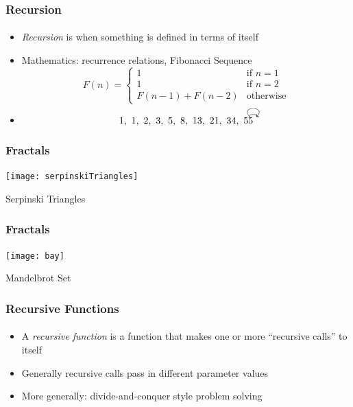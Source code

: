 \documentclass[]{beamer}
\newcommand{\tikzmark}[1]{\tikz[overlay,remember picture] \node (#1) {};}
\newcommand{\DrawBox}[2]{%
  \begin{tikzpicture}[overlay,remember picture]
    \draw[->,shorten >=5pt,shorten <=5pt,out=135,in=45,distance=0.75cm,#1] (MarkC.north) to (MarkA.north);
    \draw[->,shorten >=5pt,shorten <=5pt,out=135,in=45,distance=0.33cm,#2] (MarkC.north) to (MarkB.north);
  \end{tikzpicture}
}
\begin{document}
\begin{frame}[fragile]
  \frametitle{Recursion}
  \framesubtitle{}

\begin{itemize}[<+->]
  \item \emph{Recursion} is when something is defined in terms of itself
  \item Mathematics: recurrence relations, Fibonacci Sequence
    $$F(n) = \left\{\begin{array}{ll}
    1 & \textrm{if } n = 1 \\
    1 & \textrm{if } n = 2 \\
    F(n-1) + F(n-2) & \textrm{otherwise}
    \end{array}\right.$$
  \item[~]
\begin{equation}
1, \,\, 1,\,\, 2,\,\, 3,\,\, 5,\,\, 8,\,\, 13,\,\,  2\tikzmark{MarkA}1,\,\,  3\tikzmark{MarkB}4,\,\,  5\tikzmark{MarkC}5\DrawBox{black}{black}
\end{equation}

  \end{itemize}


\end{frame}

\begin{frame}[fragile]
  \frametitle{Fractals}
  \framesubtitle{}

\begin{center}
\texttt{[image: serpinskiTriangles]}

Serpinski Triangles
\end{center}

\end{frame}

\begin{frame}[fragile]
  \frametitle{Fractals}
  \framesubtitle{}

\begin{center}
\texttt{[image: bay]}

Mandelbrot Set
\end{center}

\end{frame}

\begin{frame}[fragile]
  \frametitle{Recursive Functions}
  \framesubtitle{}

\begin{itemize}[<+->]
  \item A \emph{recursive function} is a function that makes one or more
  ``recursive calls'' to itself
  \item Generally recursive calls pass in different parameter values
  \item More generally: divide-and-conquer style problem solving
\end{itemize}

\end{frame}
\end{document}
